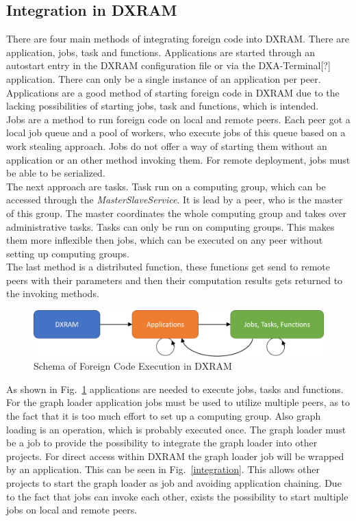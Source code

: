 \subsection{Integration in DXRAM}
There are four main methods of integrating foreign code into DXRAM. There are application, jobs, task and functions. Applications are started through an autostart entry in the DXRAM configuration file or via the DXA-Terminal[?] application. There can only be a single instance of an application per peer. Applications are a good method of starting foreign code in DXRAM due to the lacking possibilities of starting jobs, task and functions, which is intended.\\
Jobs are a method to run foreign code on local and remote peers. Each peer got a local job queue and a pool of workers, who execute jobs of this queue based on a work stealing approach. Jobs do not offer a way of starting them without an application or an other method invoking them. For remote deployment, jobs must be able to be serialized.\\
The next approach are tasks. Task run on a computing group, which can be accessed through the \textit{MasterSlaveService}. It is lead by a peer, who is the master of this group. The master coordinates the whole computing group and takes over administrative tasks. Tasks can only be run on computing groups. This makes them more inflexible then jobs, which can be executed on any peer without setting up computing groups.\\
The last method is a distributed function, these functions get send to remote peers with their parameters and then their computation results gets returned to the invoking methods.
\begin{figure}[H]
	\centering
	\includegraphics[width=1.0\linewidth]{img/codeintegration.png}
	\caption{Schema of Foreign Code Execution in DXRAM}
	\label{codeintegration}
\end{figure}

As shown in Fig.~\ref{codeintegration} applications are needed to execute jobs, tasks and functions. For the graph loader application jobs must be used to utilize multiple peers, as to the fact that it is too much effort to set up a computing group. Also graph loading is an operation, which is probably executed once. The graph loader must be a job to provide the possibility to integrate the graph loader into other projects. For direct access within DXRAM the graph loader job will be wrapped by an application. This can be seen in Fig.~\ref{integration}. This allows other projects to start the graph loader as job and avoiding application chaining. Due to the fact that jobs can invoke each other, exists the possibility to start multiple jobs on local and remote peers.

